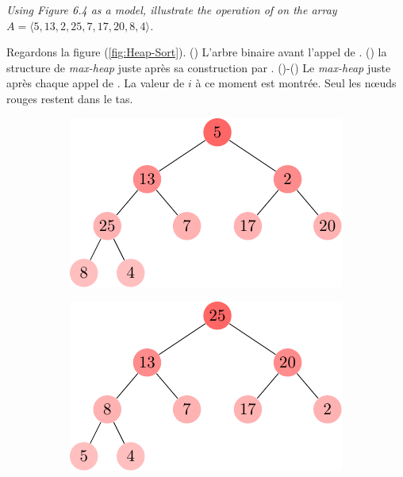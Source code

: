 \begin{description}
 \textit{Using Figure 6.4 as a model, illustrate the operation of  on the array \\$A = \langle 5, 13, 2, 25, 7, 17, 20, 8, 4 \rangle$.}
    \begin{ex}
      Regardons la figure (\ref{fig:Heap-Sort}). () L'arbre binaire avant l'appel de  . () la structure de \textit{max-heap} juste apr\`es sa construction par . ()-() Le \textit{max-heap} juste apr\`es chaque appel de . La valeur de $i$ \`a ce moment est montr\'ee. Seul les n\oe uds rouges restent dans le tas.
      \begin{figure}[t]%
        \centering
        \begin{subfigure}[t]{.30\textwidth}
          \centering
          \includegraphics[scale=0.8]{img/6_4-1/6_4-1_1}
          \caption{}\label{fig:6_4-1_1}
        \end{subfigure}
        \begin{subfigure}[t]{.30\textwidth}
          \centering
          \includegraphics[scale=0.8]{img/6_4-1/6_4-1_2}
          \caption{}\label{fig:6_4-1_2}
        \end{subfigure}
        \begin{subfigure}[t]{.30\textwidth}

\end{subfigure}
\end{figure}
\end{ex}
\end{description}
